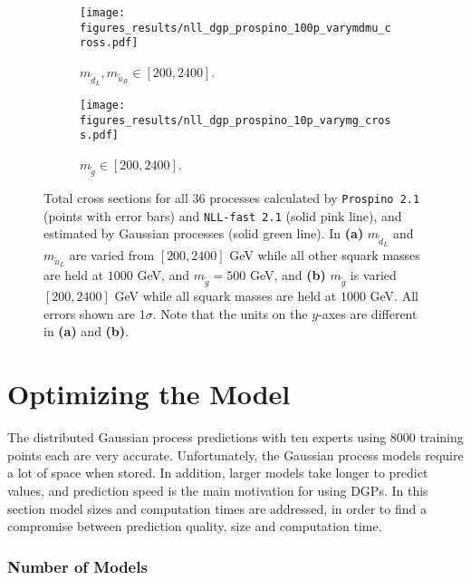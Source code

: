\documentclass[twoside,english]{uiofysmaster}
\begin{document}
{{\begin{figure}
    \centering
    \begin{subfigure}[b]{0.9\textwidth}
        \texttt{[image: figures\_results/nll\_dgp\_prospino\_100p\_varymdmu\_cross.pdf]}
\caption{$m_{\widetilde{d}_L}, m_{\widetilde{u}_R} \in [200, 2400]$.}
\label{Fig:: results : total prospino dgp vary mdL}
    \end{subfigure}

    \begin{subfigure}[b]{0.9\textwidth}
    \centering
        \texttt{[image: figures\_results/nll\_dgp\_prospino\_10p\_varymg\_cross.pdf]}
\caption{$m_{\widetilde{g}} \in [200, 2400]$.}
\label{Fig:: results : total prospino dgp varymg}
    \end{subfigure}

    \caption{Total cross sections for all 36 processes calculated by {\tt Prospino 2.1} (points with error bars) and {\tt NLL-fast 2.1} (solid pink line), and estimated by Gaussian processes (solid green line). In \textbf{(a)} $m_{\widetilde{d}_L}$ and $m_{\widetilde{u}_L}$ are varied from $[200, 2400]$ GeV while all other squark masses are held at $1000$ GeV, and $m_{\widetilde{g}}=500$ GeV, and \textbf{(b)} $m_{\widetilde{g}}$ is varied $[200, 2400]$ GeV while all squark masses are held at $1000$ GeV. All errors shown are 1$\sigma$. Note that the units on the $y$-axes are different in \textbf{(a)} and \textbf{(b)}.}\label{Fig:: results : total cross sections}
\end{figure}





\section{Optimizing the Model}\label{Sec:: results : The Optimal Model}

The distributed Gaussian process predictions with ten experts using 8000 training points each are very accurate. Unfortunately, the Gaussian process models require a lot of space when stored. In addition, larger models take longer to predict values, and prediction speed is the main motivation for using DGPs. In this section model sizes and computation times are addressed, in order to find a compromise between prediction quality, size and computation time.

\subsubsection{Number of Models}

}}
\end{document}
